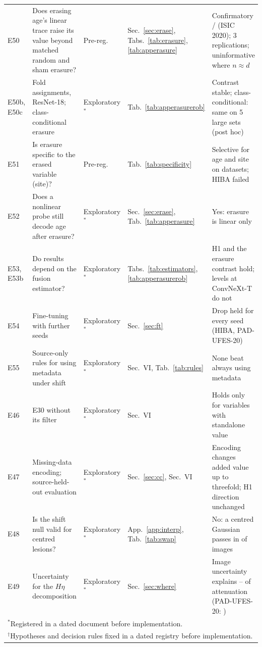 \documentclass[conference]{IEEEtran}
\begin{document}
\begin{table}[tp]
\begin{tabular}{p{1.4cm}p{5.1cm}p{1.85cm}p{2.9cm}p{5.0cm}}
E50 & Does erasing age's linear trace raise its value beyond matched random and sham erasure? & Pre-reg. & Sec.~\ref{sec:erase}, Tabs.~\ref{tab:erasure}, \ref{tab:apperasure} & Confirmatory \ERAconfRej{}/\ERAconfN{} (ISIC 2020); 3 replications; uninformative where $n\approx d$\\
E50b, E50c & Fold assignments, ResNet-18; class-conditional erasure & Exploratory$^\ast$ & Tab.~\ref{tab:apperasurerob} & Contrast stable; class-conditional: same on 5 large sets (post hoc)\\
E51 & Is erasure specific to the erased variable (site)? & Pre-reg. & Tab.~\ref{tab:specificity} & Selective for age and site on \SPECboth{} datasets; HIBA failed\\
E52 & Does a nonlinear probe still decode age after erasure? & Exploratory$^\ast$ & Sec.~\ref{sec:erase}, Tab.~\ref{tab:apperasure} & Yes: erasure is linear only\\
E53, E53b & Do results depend on the fusion estimator? & Exploratory$^\ast$ & Tabs.~\ref{tab:estimators}, \ref{tab:apperasurerob} & H1 and the erasure contrast hold; levels at ConvNeXt-T do not\\
E54 & Fine-tuning with further seeds & Exploratory$^\ast$ & Sec.~\ref{sec:ft} & Drop held for every seed (HIBA, PAD-UFES-20)\\
E55 & Source-only rules for using metadata under shift & Exploratory$^\ast$ & Sec.~VI, Tab.~\ref{tab:rules} & None beat always using metadata\\
E46 & E30 without its filter & Exploratory$^\ast$ & Sec.~VI & Holds only for variables with standalone value\\
E47 & Missing-data encoding; source-held-out evaluation & Exploratory$^\ast$ & Sec.~\ref{sec:cc}, Sec.~VI & Encoding changes added value up to threefold; H1 direction unchanged\\
E48 & Is the shift null valid for centred lesions? & Exploratory$^\ast$ & App.~\ref{app:interp}, Tab.~\ref{tab:swap} & No: a centred Gaussian passes in \GAUSSshift{} of images\\
E49 & Uncertainty for the $H\eta$ decomposition & Exploratory$^\ast$ & Sec.~\ref{sec:where} & Image uncertainty explains \DECshareMin{}--\DECshareMax{} of attenuation (PAD-UFES-20: \DECpad{})\\
\bottomrule\multicolumn{5}{l}{$^\ast$Registered in a dated document before implementation.}\\
\multicolumn{5}{l}{$^\dagger$Hypotheses and decision rules fixed in a dated registry before implementation.}
\end{tabular}\end{table}
\end{document}
